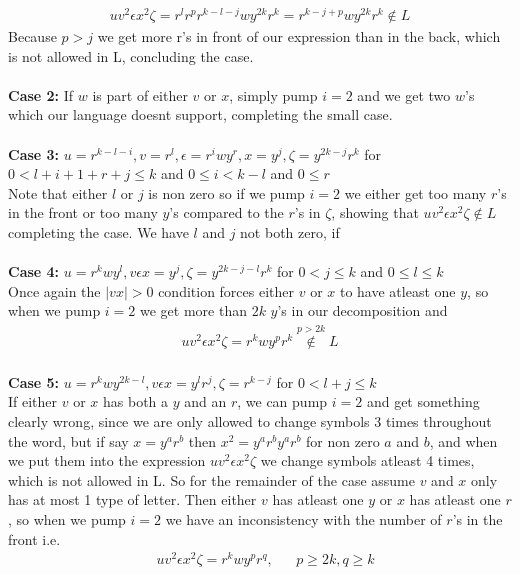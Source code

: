 \documentclass{article}
\theoremstyle{remark}
\numberwithin{equation}{section}
\begin{document}
\begin{align*}
	uv^2\epsilon x^2\zeta = r^l r^p r^{k-l-j}w y^{2k}r^k = r^{k-j+p}w y^{2k}r^k \notin L
\end{align*}
Because $p>j$ we get more r's in front of our expression than in the back, which is not allowed in L, concluding the case.\\
\\\textbf{Case 2:} If $w$ is part of either $v$ or $x$, simply pump $i = 2$ and we get two $w$'s which our language doesnt support, completing the small case.\\
\\\textbf{Case 3:} $u = r^{k-l-i}, v = r^l, \epsilon = r^iwy^r, x = y^j, \zeta = y^{2k-j}r^k$ for $0<l+i+1+r+j\leq k$ and $0\leq i<k-l$ and $0\leq r$\\
Note that either $l$ or $j$ is non zero so if we pump $i=2$ we either get too many $r$'s in the front or too many $y$'s compared to the $r$'s in $\zeta$, showing that $uv^2\epsilon x^2 \zeta \notin L$ completing the case.
We have $l$ and $j$ not both zero, if \\
\\\textbf{Case 4:} $u = r^{k}wy^l, v\epsilon x = y^j, \zeta = y^{2k-j-l}r^k$ for $0<j\leq k$ and $0\leq l \leq k$\\
Once again the $|vx|>0$ condition forces either $v$ or $x$ to have atleast one $y$, so when we pump $i=2$ we get more than $2k$ $y$'s in our decomposition and
\begin{align*}
	uv^2\epsilon x^2\zeta = r^k w y^p r^k\stackrel{p>2k}{\notin} L
\end{align*}
\\\textbf{Case 5:} $u = r^{k}wy^{2k-l}, v\epsilon x = y^lr^j, \zeta = r^{k-j}$ for $0<l+j\leq k$\\
If either $v$ or $x$ has both a $y$ and an $r$, we can pump $i=2$ and get something clearly wrong, since we are only allowed to change symbols 3 times throughout the word, but if say $x=y^ar^b$ then $x^2=y^ar^by^ar^b$ for non zero $a$ and $b$, and when we put them into the expression $uv^2\epsilon x^2 \zeta$ we change symbols atleast 4 times, which is not allowed in L. So for the remainder of the case assume $v$ and $x$ only has at most 1 type of letter. Then either $v$ has atleast one $y$ or $x$ has atleast one $r$, so when we pump $i=2$ we have an inconsistency with the number of $r$'s in the front i.e.
\begin{align*}
&uv^2\epsilon x^2\zeta = r^k w y^p r^q, && p\geq 2k, q\geq k
\end{align*}
\end{document}
